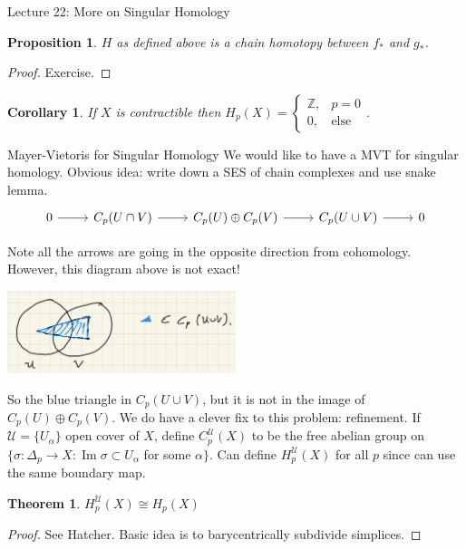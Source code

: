 \documentclass[10pt]{article}
\theoremstyle{plain}
\newtheorem{theorem}{Theorem}[section]
\newtheorem{corollary}[thm]{Corollary}
\newtheorem{prop}[thm]{Proposition}
\theoremstyle{definition}
\newcommand{\chartU}{\mathcal{U}}
\DeclareMathOperator{\Ima}{Im}
\newcommand{\mycasesthing}[2]{\begin{cases} #1 \\ #2\end{cases}}
\begin{document}
\begin{section}{Lecture 22: More on Singular Homology}
\begin{prop}
   $H$ as defined above is a chain homotopy between $f_*$ and $g_*$.
\end{prop}
\begin{proof}
    Exercise.
\end{proof}

\begin{corollary}
    If $X$ is contractible then $H_p(X) =\mycasesthing{ \mathbb{Z},& p= 0}{0,&\text{else}} $.
\end{corollary}

\begin{subsection}{Mayer-Vietoris for Singular Homology}
We would like to have a MVT for singular homology. Obvious idea: write down a SES of chain complexes and use snake lemma. $$%
\begin{tikzcd}
0 \arrow[r] & C_p(U\cap V) \arrow[r] & C_p(U)\oplus C_p(V) \arrow[r] & C_p(U\cup V) \arrow[r] & 0
\end{tikzcd}$$

Note all the arrows are going in the opposite direction from cohomology. However, this diagram above is not exact!
\begin{center}
    \includegraphics[width = 0.5\textwidth]{MayerVietorisNotExactSingularHomology.png}
\end{center}
So the blue triangle in $C_p(U\cup V)$, but it is not in the image of $C_p(U)\oplus C_p(V)$. We do have a clever fix to this problem: refinement. If $\chartU = \{ U_\alpha\}$ open cover of $X$, define $C_p^\chartU(X)$ to be the free abelian group on $\{\sigma : \Delta_p\to X : \Ima \sigma \subset U_\alpha $ for some $\alpha\}$. Can define $H^\chartU_p(X) $ for all $p$ since can use the same boundary map.

\begin{theorem}
    $H^\chartU_p(X) \cong H_p(X)$
\end{theorem}
\begin{proof}
    See Hatcher. Basic idea is to barycentrically subdivide simplices.
\end{proof}


\end{subsection}
\end{section}
\end{document}
